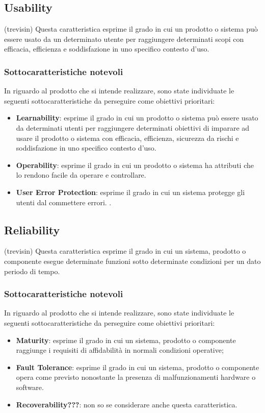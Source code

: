 \subsection{Usability} (trevisin)
Questa caratteristica esprime il grado in cui un prodotto o sistema può essere usato da un determinato utente per raggiungere determinati scopi con efficacia, efficienza e soddisfazione in uno specifico contesto d'uso.
\subsubsection{Sottocaratteristiche notevoli}
In riguardo al prodotto che si intende realizzare, sono state individuate le seguenti sottocaratteristiche da perseguire come obiettivi prioritari:
\begin{itemize}
	\item{\textbf{Learnability}}: esprime il grado in cui un prodotto o sistema può essere usato da determinati utenti per raggiungere determinati obiettivi di imparare ad usare il prodotto o sistema  con efficacia, efficienza, sicurezza da rischi e soddisfazione in uno specifico contesto d'uso.
	\item{\textbf{Operability}}: esprime il grado in cui un prodotto o sistema ha attributi che lo rendono facile da operare e controllare.
	\item{\textbf{User Error Protection}}: esprime il grado in cui un sistema protegge gli utenti dal commettere errori.
	.
\end{itemize}

\subsection{Reliability} (trevisin)
Questa caratteristica esprime il grado in cui un sistema, prodotto o componente esegue determinate funzioni sotto determinate condizioni per un dato periodo di tempo.
\subsubsection{Sottocaratteristiche notevoli}
In riguardo al prodotto che si intende realizzare, sono state individuate le seguenti sottocaratteristiche da perseguire come obiettivi prioritari: 
\begin{itemize}
	\item{\textbf{Maturity}}: esprime il grado in cui un sistema, prodotto o componente raggiunge i requisiti di affidabilità in normali condizioni operative;
	\item{\textbf{Fault Tolerance}}: esprime il grado in cui un sistema, prodotto o componente opera come previsto nonostante la presenza di malfunzionamenti hardware o software.
	\item{\textbf{Recoverability???}}: non so se considerare anche questa caratteristica.
\end{itemize}

